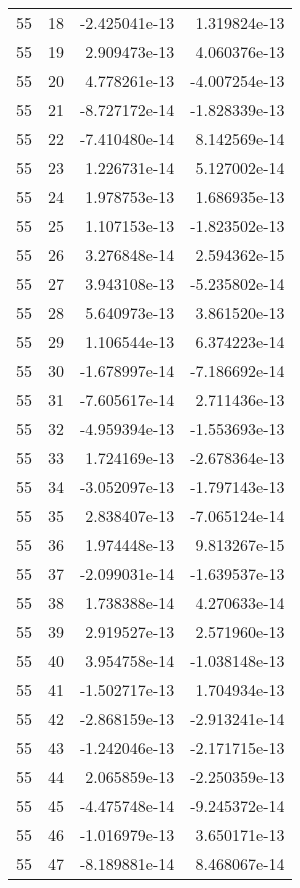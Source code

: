 \begin{tabular}{rrrr}
  55 &   18 & -2.425041e-13 &  1.319824e-13 \\
  55 &   19 &  2.909473e-13 &  4.060376e-13 \\
  55 &   20 &  4.778261e-13 & -4.007254e-13 \\
  55 &   21 & -8.727172e-14 & -1.828339e-13 \\
  55 &   22 & -7.410480e-14 &  8.142569e-14 \\
  55 &   23 &  1.226731e-14 &  5.127002e-14 \\
  55 &   24 &  1.978753e-13 &  1.686935e-13 \\
  55 &   25 &  1.107153e-13 & -1.823502e-13 \\
  55 &   26 &  3.276848e-14 &  2.594362e-15 \\
  55 &   27 &  3.943108e-13 & -5.235802e-14 \\
  55 &   28 &  5.640973e-13 &  3.861520e-13 \\
  55 &   29 &  1.106544e-13 &  6.374223e-14 \\
  55 &   30 & -1.678997e-14 & -7.186692e-14 \\
  55 &   31 & -7.605617e-14 &  2.711436e-13 \\
  55 &   32 & -4.959394e-13 & -1.553693e-13 \\
  55 &   33 &  1.724169e-13 & -2.678364e-13 \\
  55 &   34 & -3.052097e-13 & -1.797143e-13 \\
  55 &   35 &  2.838407e-13 & -7.065124e-14 \\
  55 &   36 &  1.974448e-13 &  9.813267e-15 \\
  55 &   37 & -2.099031e-14 & -1.639537e-13 \\
  55 &   38 &  1.738388e-14 &  4.270633e-14 \\
  55 &   39 &  2.919527e-13 &  2.571960e-13 \\
  55 &   40 &  3.954758e-14 & -1.038148e-13 \\
  55 &   41 & -1.502717e-13 &  1.704934e-13 \\
  55 &   42 & -2.868159e-13 & -2.913241e-14 \\
  55 &   43 & -1.242046e-13 & -2.171715e-13 \\
  55 &   44 &  2.065859e-13 & -2.250359e-13 \\
  55 &   45 & -4.475748e-14 & -9.245372e-14 \\
  55 &   46 & -1.016979e-13 &  3.650171e-13 \\
  55 &   47 & -8.189881e-14 &  8.468067e-14 \\

\end{tabular}
